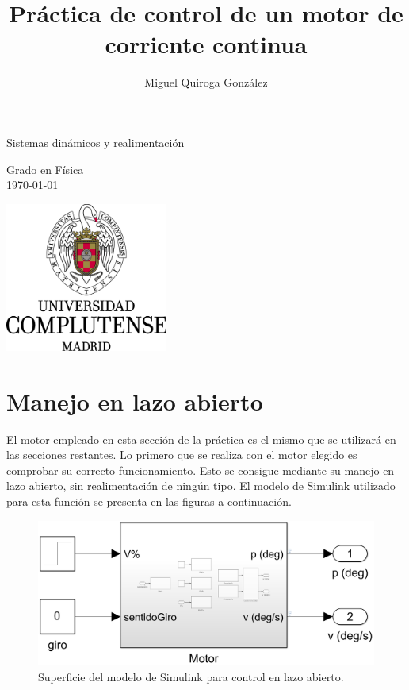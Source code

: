 \documentclass{article}
\title{Práctica de control de un motor de corriente continua}
\author{Miguel Quiroga González}
\begin{document}
\begin{titlepage}
\begin{center}
    \vspace*{3cm}
    \huge
    \textbf{\Title}
    
    \vspace{0.5cm}
    \normalsize
    Sistemas dinámicos y realimentación
    
    \vspace{1cm}
    \large
    \Author
    
    \vspace{1cm}
    \small
    \color{black!50}
    Grado en Física\\
    \today
    
    \vfill
    \includegraphics[width=0.4\textwidth]{UCM logo}
    \vspace{2cm}
\thispagestyle{empty}
\end{center}
\end{titlepage}
\newpage \thispagestyle{empty} \newpage

\section{Manejo en lazo abierto}\label{sec:p1}

El motor empleado en esta sección de la práctica es el mismo que se utilizará en las secciones restantes. Lo primero que se realiza con el motor elegido es comprobar su correcto funcionamiento. Esto se consigue mediante su manejo en lazo abierto, sin realimentación de ningún tipo. El modelo de Simulink utilizado para esta función se presenta en las figuras a continuación.

\begin{figure}[H]
    \centering
    \includegraphics[width=0.75\linewidth]{img/modeloLazoAbierto.png}
    \caption{Superficie del modelo de Simulink para control en lazo abierto.}
    \label{fig:modeloLazoAbierto}
\end{figure}
\end{document}
